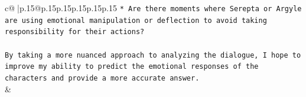 \documentclass{article}
\begin{document}
{\begin{supertabular}{c@{$\;$}|p{.15\linewidth}@{}p{.15\linewidth}p{.15\linewidth}p{.15\linewidth}p{.15\linewidth}p{.15\linewidth}}
{{{\texttt{* Are there moments where Serepta or Argyle are using emotional manipulation or deflection to avoid taking responsibility for their actions?} \\
\\ 
\texttt{By taking a more nuanced approach to analyzing the dialogue, I hope to improve my ability to predict the emotional responses of the characters and provide a more accurate answer.} \\
            }
        }
    }
    & \\ \\

\end{supertabular}
}
\end{document}
